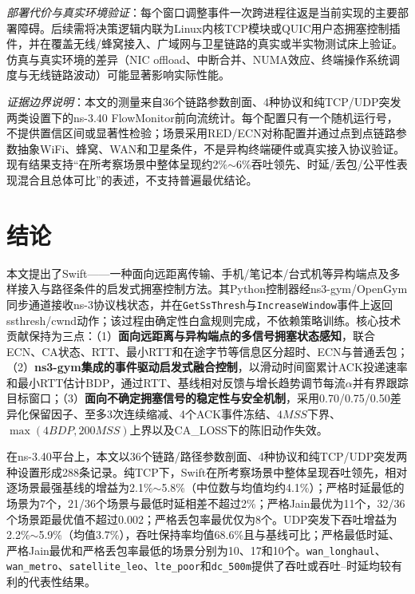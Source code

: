 \documentclass[10pt,twocolumn]{article}
\begin{document}
\textit{部署代价与真实环境验证}：每个窗口调整事件一次跨进程往返是当前实现的主要部署障碍。后续需将决策逻辑内联为Linux内核TCP模块或QUIC用户态拥塞控制插件，并在覆盖无线/蜂窝接入、广域网与卫星链路的真实或半实物测试床上验证。仿真与真实环境的差异（NIC offload、中断合并、NUMA效应、终端操作系统调度与无线链路波动）可能显著影响实际性能。

\textit{证据边界说明}：本文的测量来自36个链路参数剖面、4种协议和纯TCP/UDP突发两类设置下的ns-3.40 FlowMonitor前向流统计。每个配置只有一个随机运行号，不提供置信区间或显著性检验；场景采用RED/ECN对称配置并通过点到点链路参数抽象WiFi、蜂窝、WAN和卫星条件，不是异构终端硬件或真实接入协议验证。现有结果支持“在所考察场景中整体呈现约2\%$\sim$6\%吞吐领先、时延/丢包/公平性表现混合且总体可比”的表述，不支持普遍最优结论。


\section{结论}

本文提出了Swift——一种面向远距离传输、手机/笔记本/台式机等异构端点及多样接入与路径条件的启发式拥塞控制方法。其Python控制器经ns3-gym/OpenGym同步通道接收ns-3协议栈状态，并在\texttt{GetSsThresh}与\texttt{IncreaseWindow}事件上返回ssthresh/cwnd动作；该过程由确定性白盒规则完成，不依赖策略训练。核心技术贡献保持为三点：（1）\textbf{面向远距离与异构端点的多信号拥塞状态感知}，联合ECN、CA状态、RTT、最小RTT和在途字节等信息区分超时、ECN与普通丢包；（2）\textbf{ns3-gym集成的事件驱动启发式融合控制}，以滑动时间窗累计ACK投递速率和最小RTT估计BDP，通过RTT、基线相对反馈与增长趋势调节每流$\alpha$并有界跟踪目标窗口；（3）\textbf{面向不确定拥塞信号的稳定性与安全机制}，采用0.70/0.75/0.50差异化保留因子、至多3次连续缩减、4个ACK事件冻结、$4MSS$下界、$\max(4BDP,200MSS)$上界以及CA\_LOSS下的陈旧动作失效。

在ns-3.40平台上，本文以36个链路/路径参数剖面、4种协议和纯TCP/UDP突发两种设置形成288条记录。纯TCP下，Swift在所考察场景中整体呈现吞吐领先，相对逐场景最强基线的增益为2.1\%$\sim$5.8\%（中位数与均值均约4.1\%）；严格时延最低的场景为7个，21/36个场景与最低时延相差不超过2\%；严格Jain最优为11个，32/36个场景距最优值不超过0.002；严格丢包率最优仅为8个。UDP突发下吞吐增益为2.2\%$\sim$5.9\%（均值3.7\%），吞吐保持率均值68.6\%且与基线可比；严格最低时延、严格Jain最优和严格丢包率最低的场景分别为10、17和10个。\texttt{wan\_longhaul}、\texttt{wan\_metro}、\texttt{satellite\_leo}、\texttt{lte\_poor}和\texttt{dc\_500m}提供了吞吐或吞吐--时延均较有利的代表性结果。
\end{document}

